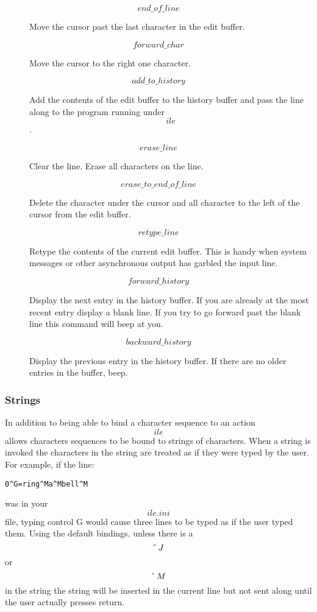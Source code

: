 \begin{description}
     \item[\[end\_of\_line\]]	  Move the cursor past the last character
			 in the edit buffer.


     \item[\[forward\_char\]]	  Move the cursor to the right one  character.


     \item[\[add\_to\_history\]]	  Add the contents of the edit buffer  to
			 the  history  buffer  and  pass the line
			 along to the program running under \[ile\].


     \item[\[erase\_line\]]		  Clear the line. Erase all characters on
			 the line.


     \item[\[erase\_to\_end\_of\_line\]]			 Delete the character
     under the cursor
			 and  all  character  to  the left of the
			 cursor from the edit buffer.


     \item[\[retype\_line\]]	 Retype the contents of the current edit
			 buffer.  This	is handy when system messages
     or other asynchronous output has
			 garbled the input line.

     \item[\[forward\_history\]]	  Display the next entry in  the  history
			 buffer.  If  you are already at the most
			 recent entry display a	 blank	line.  If
			 you  try  to  go  forward past the blank
			 line this command will beep at you.


     \item[\[backward\_history\]]	 Display the previous entry in the
     history buffer.	If there are	no older
			 entries in the buffer, beep.

\end{description}

\subsubsection{Strings}
     In addition to being able to bind a character sequence to an
     action \[ile\] allows characters sequences	 to be	 bound to
     strings of characters. When a string is invoked the characters in
     the string are treated as if they were typed by the user. For
     example, if the line:
\begin{center}
	  \verb|0^G=ring^Ma^Mbell^M|
\end{center}

     was in your \[ile.ini\] file, typing control G would cause  three
     lines  to	be  typed  as  if  the user typed them. Using the
     default bindings, unless there is a \[\mbox{\^\,} J\] or \[\mbox{\^\,} M\] in  the  string
     the string will be inserted in the current line but not sent
     along until the  user actually presses return.


